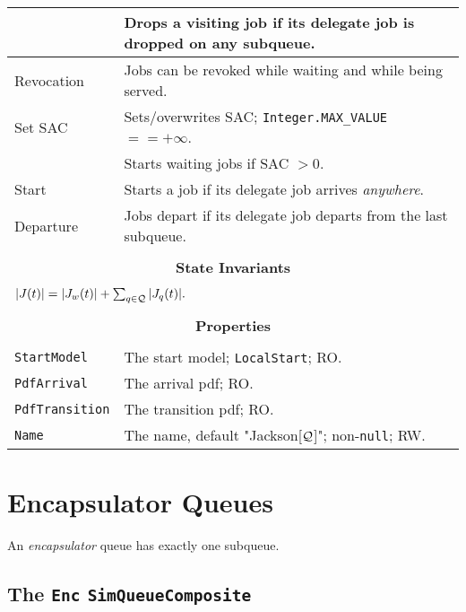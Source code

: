 \begin{tabular}{|l|l|}
	& Drops a visiting job if its delegate job is dropped on any subqueue. \\
	\hline
	Revocation & Jobs can be revoked while waiting and while being served. \\
	\hline
	Set SAC & Sets/overwrites SAC; \lstinline|Integer.MAX_VALUE| $== +\infty$. \\
	& Starts waiting jobs if SAC $> 0$. \\
	\hline
	Start & Starts a job if its delegate job arrives {\em anywhere}. \\
	\hline
	Departure & Jobs depart if its delegate job departs from the last subqueue. \\
	\hline
	\multicolumn{2}{|c|}{} \\
	\multicolumn{2}{|c|}{\bf State  Invariants} \\
	\multicolumn{2}{|c|}{} \\
	\hline
	\multicolumn{2}{|l|}{$|J(t)| = |J_{w}(t)| + \sum_{q \in \cal{Q}} |J_{q}(t)|.$} \\
	\hline
	\multicolumn{2}{|c|}{} \\
	\multicolumn{2}{|c|}{\bf Properties} \\
	\multicolumn{2}{|c|}{} \\
	\hline
	\lstinline|StartModel|    & The start model; \lstinline|LocalStart|; RO. \\
	\hline
	\lstinline|PdfArrival|    & The arrival pdf; RO. \\
	\hline
	\lstinline|PdfTransition| & The transition pdf; RO. \\
	\hline
	\lstinline|Name|          & The name, default "Jackson[${\cal Q}$]"; non-\lstinline|null|; RW. \\
	\hline
\end{tabular}

\section{Encapsulator Queues}

An {\em encapsulator\/} queue has exactly one subqueue.

\subsection{The \lstinline{Enc} \lstinline{SimQueueComposite}}
\label{sec:Enc}

